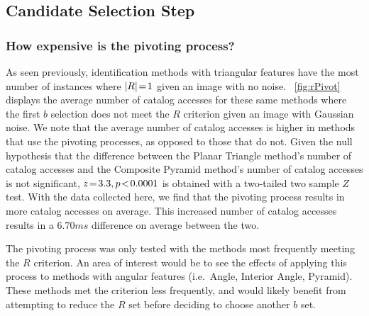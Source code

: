 \subsection{Candidate Selection Step}\label{subsec:candidateSelectionStep}
\begin{figure}
\end{figure}

\subsubsection{How expensive is the pivoting process?}
As seen previously, identification methods with triangular features have the most number of instances where
$\left| R \right| \!=\! 1$ given an image with no noise.
~\autoref{fig:rPivot} displays the average number of catalog accesses for these same methods where the first
$b$ selection does not meet the $R$ criterion given an image with Gaussian noise.
We note that the average number of catalog accesses is higher in methods that use the pivoting processes,
as opposed to those that do not.
Given the null hypothesis that the difference between the Planar Triangle method's number of catalog accesses and
the Composite Pyramid method's number of catalog accesses is not significant, $z \!=\! 3.3, p\!<\!0.0001$ is
obtained with a two-tailed two sample $Z$ test.
With the data collected here, we find that the pivoting process results in more catalog accesses on average.
This increased number of catalog accesses results in a $6.70\si{ms}$ difference on average between the two.

The pivoting process was only tested with the methods most frequently meeting the $R$ criterion.
An area of interest would be to see the effects of applying this process to methods with angular features (i.e.\ Angle,
Interior Angle, Pyramid).
These methods met the criterion less frequently, and would likely benefit from attempting to reduce the $R$ set before
deciding to choose another $b$ set.

